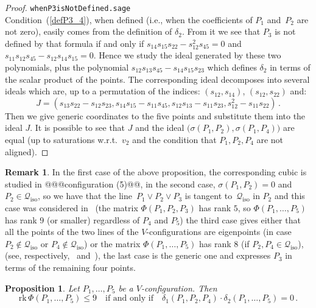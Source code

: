 \documentclass{amsart}
\theoremstyle{plain}
\newtheorem{prop}[lemma]{Proposition}
\theoremstyle{definition}
\newtheorem{rmk}[lemma]{Remark}
\newcommand{\iso}{\mathcal{Q}_{\mathrm{iso}}}
\newcommand{\rk}{\ensuremath{\mathrm{rk}}}
\begin{document}
\begin{proof}
\verb+whenP3isNotDefined.sage+\\
Condition~(\ref{defP3_4}), when defined (i.e., when the coefficients of $P_1$ and~$P_2$ are not zero), easily comes from the definition of $\delta_2$.
From it we see that $P_3$ is not defined by that formula if and only if
$s_{14}s_{15}s_{22}-s_{12}^2s_{45}=0$ and $s_{11}s_{12}s_{45}-s_{12}s_{14}s_{15}=0$.
Hence we study the ideal generated by these two polynomials, plus the
polynomial $s_{12}s_{13}s_{45}-s_{14}s_{15} s_{23}$ which defines
$\delta_2$ in terms of the scalar product of the points. The corresponding
ideal decomposes into several ideals which are, up to a permutation of
the indices: $(s_{12}, s_{14})$, $(s_{12}, s_{22})$ and:
%
\[
  J = (s_{13}s_{22} - s_{12}s_{23}, s_{14}s_{15} - s_{11}s_{45}, s_{12}s_{13} -
  s_{11}s_{23}, s_{12}^2 - s_{11}s_{22}) \,.
\]
%
Then we give generic coordinates to the five
points and substitute them into the ideal $J$. It is possible to see that
$J$ and the ideal $\bigl(\sigma(P_1, P_2), \sigma(P_1, P_4)\bigr)$ are equal (up to
saturations w.r.t.\ $v_2$ and the condition that $P_1, P_2, P_4$ are not
aligned).
\end{proof}
%
\begin{rmk}
In the first case of the above proposition, the corresponding cubic
is studied in @@@configuration (5)@@, in the
second case, $\sigma(P_1, P_2) = 0$ and $P_2\in \iso$, so
we have that the line~$P_1 \vee P_2 \vee P_3$ is tangent to~$\iso$ in $P_2$
and this case was considered in~
(the matrix $\Phi(P_1, P_2, P_3)$ has rank $5$, so
$\Phi(P_1, \dots, P_5)$ has rank $9$ (or smaller) regardless of
$P_4$ and $P_5$)
the third case gives either that all the
points of the two lines of the $V$-configurations are eigenpoints (in case
$P_2 \not\in \iso$ or $P_4 \not\in \iso$) or the matrix $\Phi(P_1, \dots, P_5)$
has rank $8$ (if $P_2, P_4 \in \iso$), (see, respectively,~
and~),
the last case is the generic one and expresses $P_3$ in terms of the remaining
four points.
\end{rmk}
%
\begin{prop}
\label{prop:d1d2}
Let $P_1, \dots, P_5$ be a $V$-configuration. Then
%
\[
  \rk \,\Phi(P_1, \dots, P_5) \leq 9
  \quad \mbox{if and only if} \quad
  \delta_1(P_1, P_2, P_4) \cdot \delta_2(P_1, \dots, P_5) = 0 \,.
\]
%
\end{prop}
\end{document}
